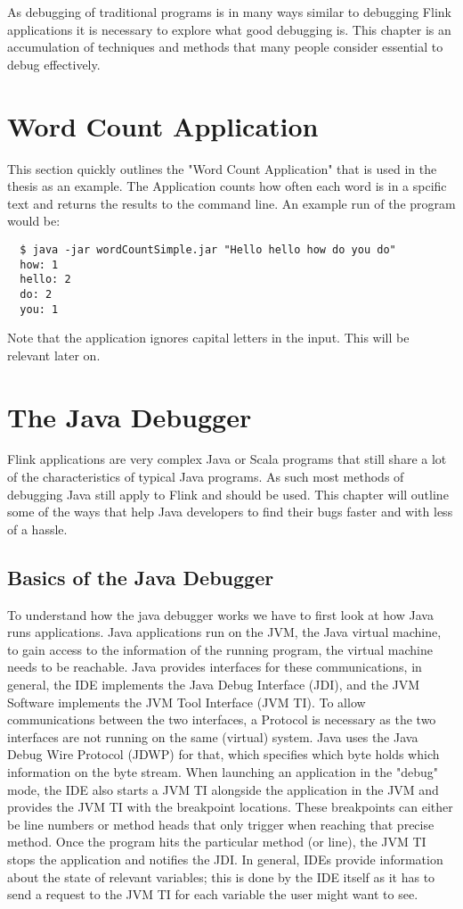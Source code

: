 As debugging of traditional programs is in many ways similar to debugging Flink applications it is necessary to explore what good debugging is. This chapter is an accumulation of techniques and methods that many people consider essential to debug effectively.

\section{Word Count Application}
\label{wordCountApplication}
This section quickly outlines the "Word Count Application" that is used in the thesis as an example. The Application counts how often each word is in a spcific text and returns the results to the command line. An example run of the program would be:

\begin{lstlisting}
  $ java -jar wordCountSimple.jar "Hello hello how do you do"
  how: 1
  hello: 2
  do: 2
  you: 1
\end{lstlisting}

Note that the application ignores capital letters in the input. This will be relevant later on.

\section{The Java Debugger}

Flink applications are very complex Java or Scala programs that still share a lot of the characteristics of typical Java programs. As such most methods of debugging Java still apply to Flink and should be used. This chapter will outline some of the ways that help Java developers to find their bugs faster and with less of a hassle.

\subsection{Basics of the Java Debugger}

To understand how the java debugger works we have to first look at how Java runs applications. Java applications run on the JVM, the Java virtual machine, to gain access to the information of the running program, the virtual machine needs to be reachable. Java provides interfaces for these communications, in general, the IDE implements the Java Debug Interface (JDI), and the JVM Software implements the JVM Tool Interface (JVM TI). To allow communications between the two interfaces, a Protocol is necessary as the two interfaces are not running on the same (virtual) system. Java uses the Java Debug Wire Protocol (JDWP) for that, which specifies which byte holds which information on the byte stream. When launching an application in the "debug" mode, the IDE also starts a JVM TI alongside the application in the JVM and provides the JVM TI with the breakpoint locations. These breakpoints can either be line numbers or method heads that only trigger when reaching that precise method. Once the program hits the particular method (or line), the JVM TI stops the application and notifies the JDI. In general, IDEs provide information about the state of relevant variables; this is done by the IDE itself as it has to send a request to the JVM TI for each variable the user might want to see.

